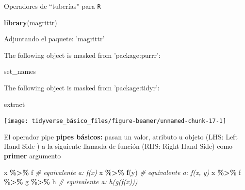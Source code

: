 \documentclass[
  ignorenonframetext,
  aspectratio=169]{beamer}
\newenvironment{Shaded}{\begin{snugshade}}{\end{snugshade}}
\newcommand{\AttributeTok}[1]{\textcolor[rgb]{0.13,0.29,0.53}{#1}}
\newcommand{\CommentTok}[1]{\textcolor[rgb]{0.56,0.35,0.01}{\textit{#1}}}
\newcommand{\DecValTok}[1]{\textcolor[rgb]{0.00,0.00,0.81}{#1}}
\newcommand{\FunctionTok}[1]{\textcolor[rgb]{0.13,0.29,0.53}{\textbf{#1}}}
\newcommand{\NormalTok}[1]{#1}
\newcommand{\SpecialCharTok}[1]{\textcolor[rgb]{0.81,0.36,0.00}{\textbf{#1}}}
\let\oldverbatim\verbatim
\let\endoldverbatim\endverbatim
\renewenvironment{verbatim}{\tiny\oldverbatim}{\endoldverbatim}
\begin{document}
\begin{frame}[fragile]{Operadores de ``tuberías'' para \texttt{R}}
\label{operadores-de-tuberuxedas-para-r-2}
\begin{Shaded}
\begin{Highlighting}[]
\FunctionTok{library}\NormalTok{(magrittr)}
\end{Highlighting}
\end{Shaded}

\begin{verbatim}

Adjuntando el paquete: 'magrittr'
\end{verbatim}

\begin{verbatim}
The following object is masked from 'package:purrr':

    set_names
\end{verbatim}

\begin{verbatim}
The following object is masked from 'package:tidyr':

    extract
\end{verbatim}

\begin{Shaded}
\end{Shaded}

\begin{center}\texttt{[image: tidyverse\_básico\_files/figure-beamer/unnamed-chunk-17-1]} \end{center}
\end{frame}

\begin{frame}[fragile]{El operador pipe}
\label{el-operador-pipe}
\textbf{pipes básicos:} pasan un valor, atributo u objeto (LHS: Left
Hand Side ) a la siguiente llamada de función (RHS: Right Hand Side)
como \textbf{primer} argumento

\begin{Shaded}
\begin{Highlighting}[]
\NormalTok{x }\SpecialCharTok{\%\textgreater{}\%}\NormalTok{ f }\CommentTok{\# equivalente a: f(x)}
\NormalTok{x }\SpecialCharTok{\%\textgreater{}\%} \FunctionTok{f}\NormalTok{(y) }\CommentTok{\# equivalente a: f(x, y)}
\NormalTok{x }\SpecialCharTok{\%\textgreater{}\%}\NormalTok{ f }\SpecialCharTok{\%\textgreater{}\%}\NormalTok{ g }\SpecialCharTok{\%\textgreater{}\%}\NormalTok{ h }\CommentTok{\# equivalente a: h(g(f(x)))}
\end{Highlighting}
\end{Shaded}
\end{frame}
\end{document}

